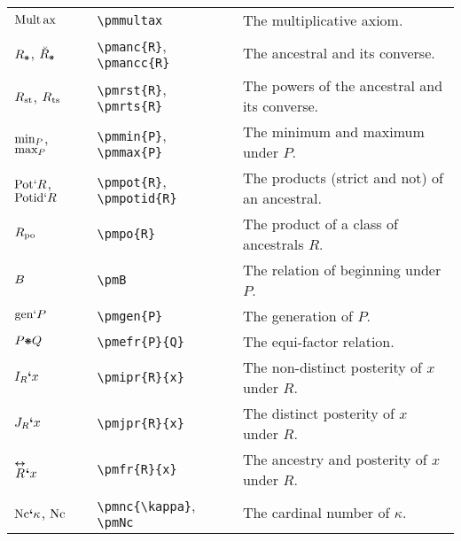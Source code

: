 \documentclass[12pt]{article}
\begin{document}
\begin{tabular}{@{}p{3cm} | p{5cm} | p{8.25cm}}
	$\mathop{\text{Mult}} \mathop{\text{ax}}$ & \verb|\pmmultax| & The multiplicative axiom. \\
	$\pmanc{R}$, $\pmancc{R}$ & \verb|\pmanc{R}|, \verb|\pmancc{R}| & The ancestral and its converse. \\
	$R_\text{st}$, $R_\text{ts}$ & \verb|\pmrst{R}|, \verb|\pmrts{R}| & The powers of the ancestral and its converse. \\
	$\text{min}_{P}$, $\text{max}_{P}$ & \verb|\pmmin{P}|, \verb|\pmmax{P}| & The minimum and maximum under $P$. \\
	$\text{Pot}\mathbf{`}R$, $\text{Potid}\mathbf{`}R$ & \verb|\pmpot{R}|, \verb|\pmpotid{R}| & The products (strict and not) of an ancestral. \\
	 $R_\text{po}$ & \verb|\pmpo{R}| & The product of a class of ancestrals $R$. \\
	 $B$ & \verb|\pmB| & The relation of beginning under $P$. \\
	$\text{gen}\mathbf{`}P$ & \verb|\pmgen{P}| & The generation of $P$. \\
	$\pmefr{P}{Q}$ & \verb|\pmefr{P}{Q}| & The equi-factor relation. \\
	$I_{R}\textbf{`}x$ & \verb|\pmipr{R}{x}| &  The non-distinct posterity of $x$ under $R$. \\
	$J_{R}\textbf{`}x$ & \verb|\pmjpr{R}{x}| &  The distinct posterity of $x$ under $R$. \\
	$\overset{\boldsymbol{\leftrightarrow}}{R}\textbf{`}x$ & \verb|\pmfr{R}{x}| & The ancestry and posterity of $x$ under $R$. \\
	$\text{Nc}\textbf{`}\kappa$, $\text{Nc}$ & \verb|\pmnc{\kappa}|, \verb|\pmNc| & The cardinal number of $\kappa$.
\end{tabular}
\end{document}

